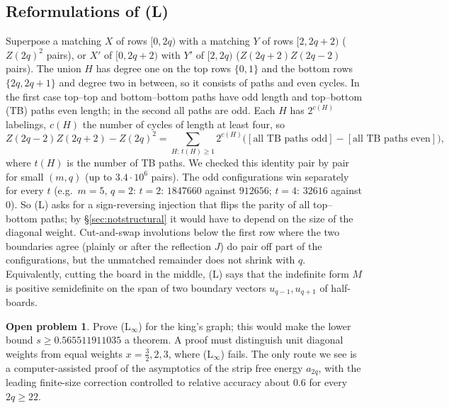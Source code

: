 \documentclass[11pt]{amsart}
\theoremstyle{definition}
\newtheorem{problem}[theorem]{Open problem}
\theoremstyle{remark}
\begin{document}
\subsection{Reformulations of (L)}
Superpose a matching $X$ of rows $[0, 2q)$ with a matching $Y$ of rows $[2, 2q+2)$ ($Z(2q)^2$
pairs), or $X'$ of $[0, 2q+2)$ with $Y'$ of $[2, 2q)$ ($Z(2q+2)Z(2q-2)$ pairs). The union $H$ has
degree one on the top rows $\{0, 1\}$ and the bottom rows $\{2q, 2q+1\}$ and degree two in between,
so it consists of paths and even cycles. In the first case top--top and bottom--bottom paths have
odd length and top--bottom (TB) paths even length; in the second all paths are odd. Each $H$ has
$2^{c(H)}$ labelings, $c(H)$ the number of cycles of length at least four, so
\[
  Z(2q-2)Z(2q+2) - Z(2q)^2 = \sum_{H:\,t(H) \ge 1} 2^{c(H)}
  \bigl([\text{all TB paths odd}] - [\text{all TB paths even}]\bigr),
\]
where $t(H)$ is the number of TB paths. We checked this identity pair by pair for small
$(m, q)$ (up to $3.4\cdot10^{6}$ pairs). The odd configurations win separately for every $t$
(e.g.\ $m = 5$, $q = 2$: $t = 2$: $1847660$ against $912656$; $t = 4$: $32616$ against $0$). So (L)
asks for a sign-reversing injection that flips the parity of all top--bottom paths; by
\S\ref{sec:notstructural} it would have to depend on the size of the diagonal weight. Cut-and-swap
involutions below the first row where the two boundaries agree (plainly or after the reflection
$J$) do pair off part of the configurations, but the unmatched remainder does not shrink with $q$.
Equivalently, cutting the board in the middle, (L) says that the indefinite form $M$ is positive
semidefinite on the span of two boundary vectors $u_{q-1}, u_{q+1}$ of half-boards.

\begin{problem}
Prove (L$_\infty$) for the king's graph; this would make the lower bound $s \ge 0.565511911035$
a theorem. A proof must distinguish unit diagonal weights from equal weights $x = \tfrac32, 2, 3$,
where (L$_\infty$) fails. The only route we see is a computer-assisted proof of the asymptotics
of the strip free energy $a_{2q}$, with the leading finite-size correction controlled to relative
accuracy about $0.6$ for every $2q \ge 22$.
\end{problem}
\end{document}
